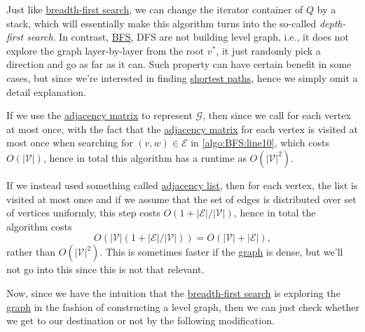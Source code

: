 \begin{remark}\label{rmk:DFS}
	Just like \hyperref[algo:BFS]{breadth-first search}, we can change the iterator container of \(Q\) by a stack, which will essentially make this algorithm turns into the so-called \emph{depth-first search}. In contrast, \hyperref[algo:BFS]{BFS}, DFS are not building level graph, i.e., it does not explore the graph layer-by-layer from the root \(v^{\ast} \), it just randomly pick a direction and go as far as it can. Such property can have certain benefit in some cases, but since we're interested in finding \hyperref[def:shortest-path]{shortest paths}, hence we simply omit a detail explanation.
\end{remark}

If we use the \hyperref[def:adjacency-matrix]{adjacency matrix} to represent \(\mathcal{G} \), then since we call for each vertex at most once, with the fact that the \hyperref[def:adjacency-matrix]{adjacency matrix} for each vertex is visited at most once when searching for \((v, w)\in \mathcal{E} \) in \autoref{algo:BFS:line10}, which costs \(O(\left\vert \mathcal{V}  \right\vert )\), hence in total this algorithm has a runtime as \(O(\left\vert \mathcal{V}  \right\vert^{2} )\).

\begin{remark}
	If we instead used something called \href{https://en.wikipedia.org/wiki/Adjacency_list#:~:text=In%20graph%20theory%20and%20computer,particular%20vertex%20in%20the%20graph.}{adjacency list}, then for each vertex, the list is visited at most once and if we assume that the set of edges is distributed over set of vertices uniformly, this step costs \(O(1 + \left\vert \mathcal{E}  \right\vert / \left\vert \mathcal{V}  \right\vert )\), hence in total the algorithm costs
	\[
		O(\left\vert \mathcal{V}  \right\vert (1 + \left\vert \mathcal{E}  \right\vert / \left\vert \mathcal{V}  \right\vert ))= O(\left\vert \mathcal{V}  \right\vert + \left\vert \mathcal{E}  \right\vert ),
	\]
	rather than \(O(\left\vert \mathcal{V}  \right\vert ^{2} )\). This is sometimes faster if the \hyperref[def:graph]{graph} is dense, but we'll not go into this since this is not that relevant.
\end{remark}

Now, since we have the intuition that the \hyperref[algo:BFS]{breadth-first search} is exploring the \hyperref[def:graph]{graph} in the fashion of constructing a level graph, then we can just check whether we get to our destination or not by the following modification.


